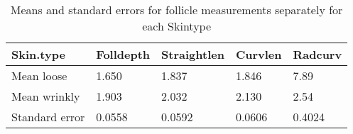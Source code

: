 %

\begin{table}[ht]
\centering
\caption{Means and standard errors for follicle measurements separately for each  Skintype}
\label{tab:skintype}
\vspace{0.1in}
\begin{tabular}{|p{0.6in}|p{0.6in}|p{0.6in}|p{0.6in}|p{0.6in}|} \hline
   Skin.type & Folldepth & Straightlen & Curvlen  & Radcurv\\   
    \hline
  Mean loose & 1.650 & 1.837 & 1.846 & 7.89  \\ 
  Mean wrinkly & 1.903 & 2.032 & 2.130 & 2.54 \\ 
  Standard error & 0.0558 & 0.0592 & 0.0606 & 0.4024  \\ 
   \hline
\end{tabular}
\end{table}

%


